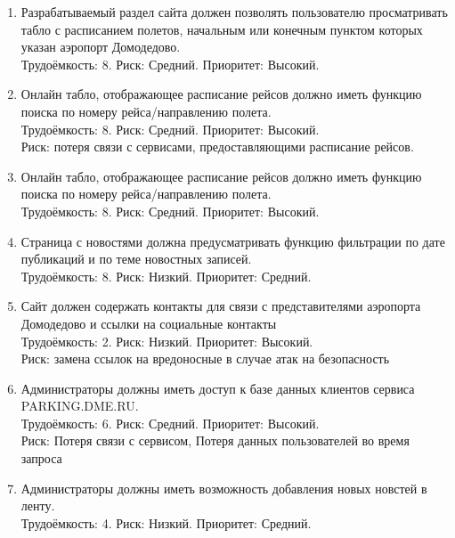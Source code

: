 
\begin{enumerate}
    \item Разрабатываемый раздел сайта должен позволять пользователю
          просматривать табло с расписанием полетов, начальным или
          конечным пунктом которых указан аэропорт Домодедово. \\
          Трудоёмкость: 8. Риск: Средний. Приоритет: Высокий.

    \item Онлайн табло, отображающее расписание рейсов должно иметь
          функцию поиска по номеру рейса/направлению полета. \\
          Трудоёмкость: 8. Риск: Средний. Приоритет: Высокий. \\
          Риск: потеря связи с сервисами, предоставляющими расписание рейсов.

    \item Онлайн табло, отображающее расписание рейсов должно иметь
          функцию поиска по номеру рейса/направлению полета. \\
          Трудоёмкость: 8. Риск: Средний. Приоритет: Высокий.

    \item Страница с новостями должна предусматривать функцию
          фильтрации по дате публикаций и по теме новостных записей. \\
          Трудоёмкость: 8. Риск: Низкий. Приоритет: Средний.
          
    \item Сайт должен содержать контакты для связи с представителями
          аэропорта Домодедово и ссылки на социальные контакты \\
          Трудоёмкость: 2. Риск: Низкий. Приоритет: Высокий. \\
          Риск: замена ссылок на вредоносные в случае атак на безопасность

    \item Администраторы должны иметь доступ к базе данных клиентов
          сервиса PARKING.DME.RU. \\
          Трудоёмкость: 6. Риск: Средний. Приоритет: Высокий. \\
          Риск: Потеря связи с сервисом, Потеря данных пользователей во 
          время запроса

    \item Администраторы должны иметь возможность добавления новых
          новстей в ленту. \\
          Трудоёмкость: 4. Риск: Низкий. Приоритет: Средний.


\end{enumerate}
